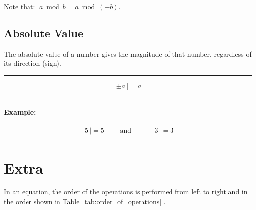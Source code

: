 \documentclass[a5paper,9pt]{book}
\theoremstyle{definition}
\newcommand{\txtlinesur}[1]{%
    \vspace*{\baselineskip}

    \hrule%

    \vspace*{\medskipamount}

    #1

    \vspace*{\medskipamount}

    \hrule%

    \vspace*{\baselineskip}
}
\newcommand{\fig}[2]{%
    \hyperref[#2]{#1~\ref*{#2}}%
}
\begin{document}
            Note that: $\;a\bmod{b} = a\bmod{(-b)}$.

            \pagebreak

            \subsection{Absolute Value}

            The absolute value of a number gives the magnitude of that number, regardless
            of its direction (sign).

            \txtlinesur{%
                \begin{equation*}
                    |\pm a\,| = a
                \end{equation*}
            }

            \paragraph{Example:}

            \begin{align*}
                |\,5\,| = 5 \qquad\text{ and }\qquad |-3\,| = 3 \\
            \end{align*}

% 
% 
% 
% 
% 
        \section{Extra}

        In an equation, the order of the operations is performed from left to right and
        in the order shown in \fig{Table}{tab:order_of_operations}.
\end{document}
